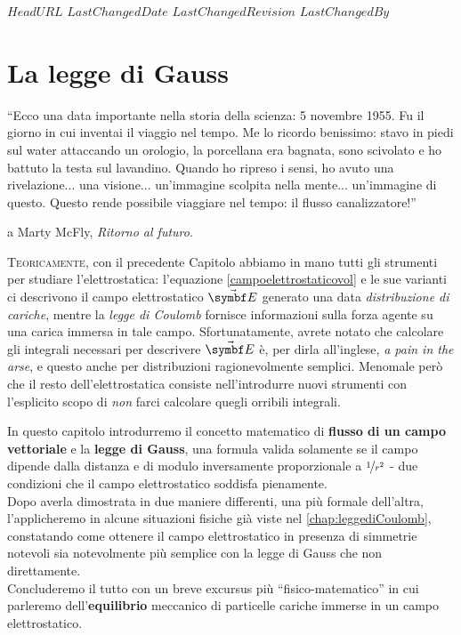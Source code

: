 \svnidlong
{$HeadURL$}
{$LastChangedDate$}
{$LastChangedRevision$}
{$LastChangedBy$}

\chapter{La legge di Gauss}%

\begin{introduction}
	``Ecco una data importante nella storia della scienza: 5 novembre 1955. Fu il giorno in cui inventai il viaggio nel tempo. Me lo ricordo benissimo: stavo in piedi sul water attaccando un orologio, la porcellana era bagnata, sono scivolato e ho battuto la testa sul lavandino. Quando ho ripreso i sensi, ho avuto una rivelazione... una visione... un'immagine scolpita nella mente... un'immagine
	di questo. Questo rende possibile viaggiare nel tempo: il flusso canalizzatore!''
	\begin{flushright}
		 a Marty McFly, \emph{Ritorno al futuro}.
	\end{flushright}
\end{introduction}
\lettrine[findent=1pt, nindent=0pt]{T}{eoricamente}, con il precedente Capitolo abbiamo in mano tutti gli strumenti per studiare l'elettrostatica: l'equazione \eqref{campoelettrostaticovol} e le sue varianti ci descrivono il campo elettrostatico $\vba{E}$ generato una data \textit{distribuzione di cariche}, mentre la \textit{legge di Coulomb} fornisce informazioni sulla forza agente su una carica immersa in tale campo. Sfortunatamente, avrete notato che calcolare gli integrali necessari per descrivere $\vba{E}$ è, per dirla all'inglese, \textit{a pain in the arse}, e questo anche per distribuzioni ragionevolmente semplici. Menomale però che il resto dell'elettrostatica consiste nell'introdurre nuovi strumenti con l'esplicito scopo di \textit{non} farci calcolare quegli orribili integrali.

In questo capitolo introdurremo il concetto matematico di \textbf{flusso di un campo vettoriale} e la \textbf{legge di Gauss}, una formula valida solamente se il campo dipende dalla distanza e di modulo inversamente proporzionale a $\nicefrac{1}{r^2}$ - due condizioni che il campo elettrostatico soddisfa pienamente.\\
Dopo averla dimostrata in due maniere differenti, una più formale dell'altra, l'applicheremo in alcune situazioni fisiche già viste nel \autoref{chap:leggediCoulomb}, constatando come ottenere il campo elettrostatico in presenza di simmetrie notevoli sia notevolmente più semplice con la legge di Gauss che non direttamente.\\
Concluderemo il tutto con un breve excursus più ``fisico-matematico'' in cui parleremo dell'\textbf{equilibrio} meccanico di particelle cariche immerse in un campo elettrostatico.
\pagebreak
